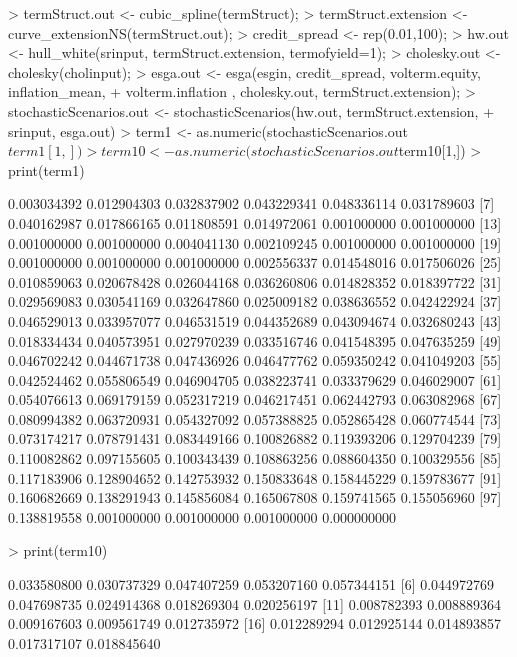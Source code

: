 \documentclass[12pt]{article}
\begin{document}
\begin{Schunk}
\begin{Sinput}
> termStruct.out <- cubic_spline(termStruct);
> termStruct.extension <- curve_extensionNS(termStruct.out);
> credit_spread <- rep(0.01,100);
> hw.out <- hull_white(srinput, termStruct.extension, termofyield=1);
> cholesky.out <- cholesky(cholinput);
> esga.out <- esga(esgin, credit_spread, volterm.equity, inflation_mean,
+ volterm.inflation , cholesky.out, termStruct.extension);
> stochasticScenarios.out <- stochasticScenarios(hw.out, termStruct.extension,
+ srinput, esga.out)
> term1 <- as.numeric(stochasticScenarios.out$term1[1,])
> term10 <- as.numeric(stochasticScenarios.out$term10[1,])
> print(term1)
\end{Sinput}
\begin{Soutput}
  [1] 0.003034392 0.012904303 0.032837902 0.043229341 0.048336114 0.031789603
  [7] 0.040162987 0.017866165 0.011808591 0.014972061 0.001000000 0.001000000
 [13] 0.001000000 0.001000000 0.004041130 0.002109245 0.001000000 0.001000000
 [19] 0.001000000 0.001000000 0.001000000 0.002556337 0.014548016 0.017506026
 [25] 0.010859063 0.020678428 0.026044168 0.036260806 0.014828352 0.018397722
 [31] 0.029569083 0.030541169 0.032647860 0.025009182 0.038636552 0.042422924
 [37] 0.046529013 0.033957077 0.046531519 0.044352689 0.043094674 0.032680243
 [43] 0.018334434 0.040573951 0.027970239 0.033516746 0.041548395 0.047635259
 [49] 0.046702242 0.044671738 0.047436926 0.046477762 0.059350242 0.041049203
 [55] 0.042524462 0.055806549 0.046904705 0.038223741 0.033379629 0.046029007
 [61] 0.054076613 0.069179159 0.052317219 0.046217451 0.062442793 0.063082968
 [67] 0.080994382 0.063720931 0.054327092 0.057388825 0.052865428 0.060774544
 [73] 0.073174217 0.078791431 0.083449166 0.100826882 0.119393206 0.129704239
 [79] 0.110082862 0.097155605 0.100343439 0.108863256 0.088604350 0.100329556
 [85] 0.117183906 0.128904652 0.142753932 0.150833648 0.158445229 0.159783677
 [91] 0.160682669 0.138291943 0.145856084 0.165067808 0.159741565 0.155056960
 [97] 0.138819558 0.001000000 0.001000000 0.001000000 0.000000000
\end{Soutput}
\begin{Sinput}
> print(term10)
\end{Sinput}
\begin{Soutput}
  [1]  0.033580800  0.030737329  0.047407259  0.053207160  0.057344151
  [6]  0.044972769  0.047698735  0.024914368  0.018269304  0.020256197
 [11]  0.008782393  0.008889364  0.009167603  0.009561749  0.012735972
 [16]  0.012289294  0.012925144  0.014893857  0.017317107  0.018845640

\end{Soutput}
\end{Schunk}
\end{document}
